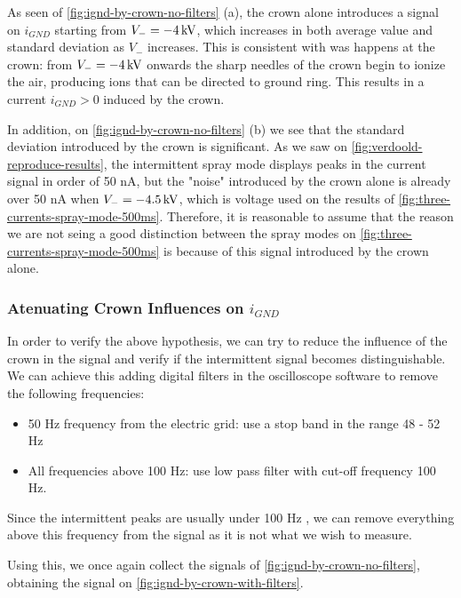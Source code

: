 \documentclass[oneside,12pt]{article}
\begin{document}
As seen of \autoref{fig:ignd-by-crown-no-filters} (a), the crown alone introduces a signal on $i_{GND}$ starting
from $V_- = - 4 \,\mathrm{kV}$, which increases in both average value and standard deviation as $V_-$ increases.
This is consistent with was happens at the crown: from $V_- = - 4 \,\mathrm{kV}$ onwards the sharp needles 
of the crown begin to ionize the air, producing ions that can be 
directed to ground ring. This results in a current $i_{GND} > 0$ induced by the crown.

In addition, on \autoref{fig:ignd-by-crown-no-filters} (b) we see that the standard deviation introduced by the crown
is significant. As we saw on \autoref{fig:verdoold-reproduce-results}, the intermittent spray mode 
displays peaks in the current signal in order of 50 nA, but the "noise" introduced by the 
crown alone is already over 50 nA when $V_- = -4.5 \,\mathrm{kV}$, which is voltage used on the results 
of \autoref{fig:three-currents-spray-mode-500ms}. Therefore, it is reasonable to assume that the reason we are
not seing a good distinction between the spray modes on \autoref{fig:three-currents-spray-mode-500ms} is 
because of this signal introduced by the crown alone.

\subsubsection{Atenuating Crown Influences on $i_{GND}$}

In order to verify the above hypothesis, we can try to reduce the influence of the crown
in the signal and verify if the intermittent signal becomes distinguishable. We can achieve this adding digital filters 
in the oscilloscope software to remove the following frequencies:

\begin{itemize}
    \item 50 Hz frequency from the electric grid: use a stop band in the range 48 - 52 Hz
    \item All frequencies above 100 Hz: use low pass filter with cut-off frequency 100 Hz.
\end{itemize}

Since the intermittent peaks are usually under 100 Hz \citep{Verdoold2013}, we can remove 
everything above this frequency from the signal as it is not what we wish to measure.

Using this, we once again collect the signals of \autoref{fig:ignd-by-crown-no-filters}, obtaining the signal 
on \autoref{fig:ignd-by-crown-with-filters}.
\end{document}
